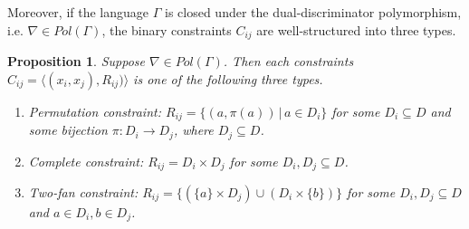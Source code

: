 \documentclass[11pt]{article}
\newtheorem{proposition}[theorem]{Proposition}
\begin{document}
Moreover, if the language $\Gamma$ is closed under the dual-discriminator polymorphism, i.e. $\nabla \in Pol(\Gamma)$, the binary constraints $C_{ij}$ are well-structured into three types.

\begin{proposition}\cite{Cooper1994CharacterisingTC}
    Suppose $\nabla \in Pol(\Gamma)$. Then each constraints $C_{ij} = \langle (x_i,x_j),R_{ij}) \rangle$ is one of the following three types.
    \begin{enumerate}
        \item Permutation constraint: $R_{ij} = \{(a, \pi(a)) \, | \, a \in D_i \}$ for some $D_i \subseteq D$ and some bijection $\pi:D_i \rightarrow D_j$, where $D_j \subseteq D$.
        \item Complete constraint: $R_{ij} = D_i \times D_j$ for some $D_i, D_j \subseteq D$.
        \item Two-fan constraint: $R_{ij} = \{(\{a\} \times D_j) \cup (D_i \times \{ b \})\}$ for some $D_i, D_j \subseteq D$ and $a \in D_i, b \in D_j$.
    \end{enumerate}
\end{proposition}
\end{document}
